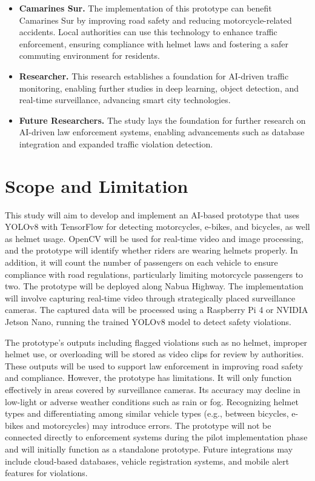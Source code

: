 \begin{refsection}
\begin{itemize}
    \item \textbf{Camarines Sur.} The implementation of this prototype can benefit Camarines Sur by improving road safety and reducing motorcycle-related accidents. Local authorities can use this technology to enhance traffic enforcement, ensuring compliance with helmet laws and fostering a safer commuting environment for residents.
   
    \item \textbf{Researcher.} This research establishes a foundation for AI-driven traffic monitoring, enabling further studies in deep learning, object detection, and real-time surveillance, advancing smart city technologies.
   
    \item \textbf{Future Researchers.} The study lays the foundation for further research on AI-driven law enforcement systems, enabling advancements such as database integration and expanded traffic violation detection.
\end{itemize}


\section{Scope and Limitation}


This study will aim to develop and implement an AI-based prototype that uses YOLOv8 with TensorFlow for detecting motorcycles, e-bikes, and bicycles, as well as helmet usage. OpenCV will be used for real-time video and image processing, and the prototype will identify whether riders are wearing helmets properly. In addition, it will count the number of passengers on each vehicle to ensure compliance with road regulations, particularly limiting motorcycle passengers to two. The prototype will be deployed along Nabua Highway. The implementation will involve capturing real-time video through strategically placed surveillance cameras. The captured data will be processed using a Raspberry Pi 4 or NVIDIA Jetson Nano, running the trained YOLOv8 model to detect safety violations.


The prototype’s outputs including flagged violations such as no helmet, improper helmet use, or overloading will be stored as video clips for review by authorities. These outputs will be used to support law enforcement in improving road safety and compliance. However, the prototype has limitations. It will only function effectively in areas covered by surveillance cameras. Its accuracy may decline in low-light or adverse weather conditions such as rain or fog. Recognizing helmet types and differentiating among similar vehicle types (e.g., between bicycles, e-bikes and motorcycles) may introduce errors. The prototype will not be connected directly to enforcement systems during the pilot implementation phase and will initially function as a standalone prototype. Future integrations may include cloud-based databases, vehicle registration systems, and mobile alert features for violations.





\end{refsection}
